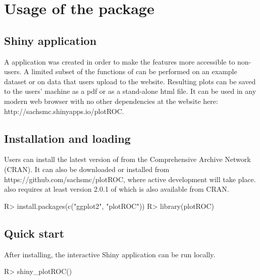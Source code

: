 \documentclass[codesnippet]{jss}
\begin{document}
\section{Usage of the package}\label{usage-of-the-package}

\subsection{Shiny application}\label{shiny-application}

A  application \citep{shiny} was created in order to make the
features more accessible to non- users. A limited subset of
the functions of  can be performed on an example dataset or
on data that users upload to the website. Resulting plots can be saved
to the users' machine as a pdf or as a stand-alone html file. It can be
used in any modern web browser with no other dependencies at the website
here: http://sachsmc.shinyapps.io/plotROC.

\subsection{Installation and loading}\label{installation-and-loading}

Users can install the latest version of  from the
Comprehensive  Archive Network (CRAN). It can also be
downloaded or installed from https://github.com/sachsmc/plotROC, where
active development will take place.  also requires at least
version 2.0.1 of  which is also available from CRAN.

\begin{Schunk}
\begin{Sinput}
R> install.packages(c("ggplot2", "plotROC"))
R> library(plotROC)
\end{Sinput}
\end{Schunk}

\subsection{Quick start}\label{quick-start}

After installing, the interactive Shiny application can be run locally.

\begin{Schunk}
\begin{Sinput}
R> shiny_plotROC()
\end{Sinput}
\end{Schunk}
\end{document}
